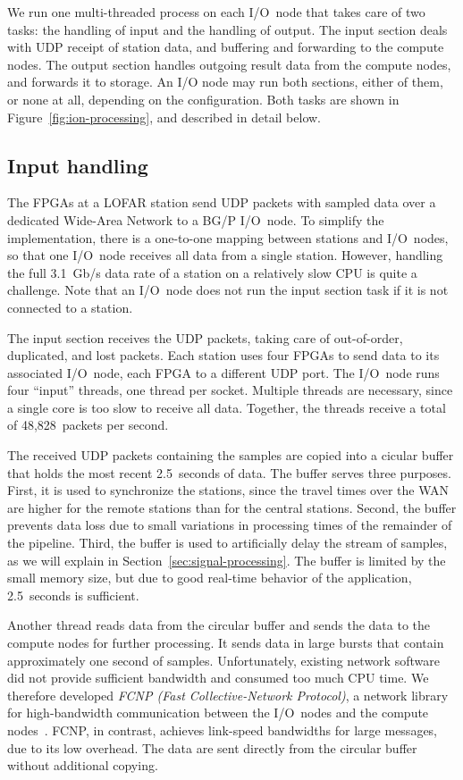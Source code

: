 \documentclass[10pt]{article}
\begin{document}
We run one multi-threaded process on each I/O~node that takes care of two
tasks: the handling of input and the handling of output.
The input section deals with UDP receipt of station data, and buffering and forwarding to the compute nodes.
The output section handles outgoing result data from the compute nodes, and forwards it to storage.
An I/O node may run both sections, either of them, or none at all, depending
on the configuration.
Both tasks are shown in Figure~\ref{fig:ion-processing}, and described in detail below.


\subsection{Input handling}
\label{sec:input-handling}

The FPGAs at a LOFAR station send UDP packets with sampled data over a
dedicated Wide-Area Network to a BG/P I/O~node.
To simplify the implementation, there is a one-to-one mapping between
stations and I/O~nodes, so that one I/O~node receives all data from a single
station.
However, handling the full 3.1~Gb/s data rate of a station on a relatively
slow CPU is quite a challenge.
Note that an I/O~node does not run the input section task if it is not
connected to a station.

The input section receives the UDP packets, taking care of out-of-order,
duplicated, and lost packets.
Each station uses four FPGAs to send data to its associated I/O~node,
each FPGA to a different UDP port.
The I/O~node runs four ``input'' threads, one thread per socket.
Multiple threads are necessary, since a single core is too slow to receive all
data.
Together, the threads receive a total of 48,828~packets per second.

The received UDP packets containing the samples are copied into a cicular buffer that holds the most recent
2.5~seconds of data.
The buffer serves three purposes.
First, it is used to synchronize the stations, since the travel times over
the WAN are higher for the remote stations than for the central stations.
Second, the buffer prevents data loss due to small variations in processing
times of the remainder of the pipeline.
Third, the buffer is used to artificially delay the stream of samples,
as we will explain in Section~\ref{sec:signal-processing}.
The buffer is limited by the small memory size, but due to good real-time
behavior of the application, 2.5~seconds is sufficient.

Another thread reads data from the circular buffer and sends the data to
the compute nodes for further processing.
It sends data in large bursts that contain approximately one second of samples.
Unfortunately, existing network software did not provide sufficient bandwidth
and consumed too much CPU time.
We therefore developed \emph{FCNP (Fast Collective-Network Protocol)}, a 
network library for high-bandwidth communication between the I/O~nodes and the
compute nodes~\cite{Romein:09a}.
FCNP, in contrast, achieves link-speed bandwidths for large messages, due to
its low overhead.
The data are sent directly from the circular buffer without additional copying.
\end{document}
